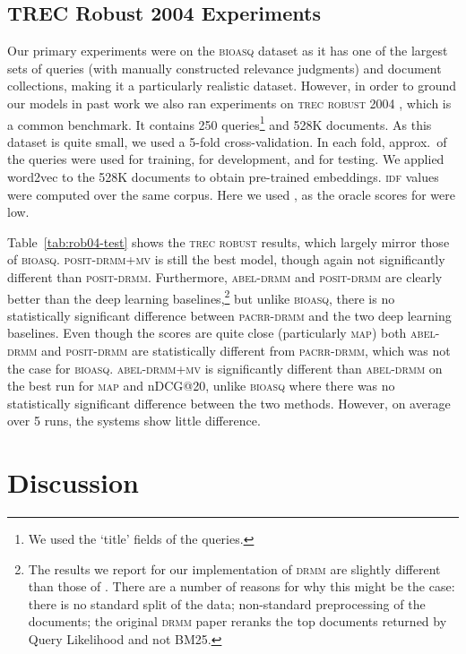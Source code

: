 \documentclass[11pt,a4paper]{article}
\newcommand{\bioasq}{\textsc{bioasq}\xspace}
\newcommand{\trecrob}{\textsc{trec robust}\xspace}
\newcommand{\drmm}{\textsc{drmm}\xspace}
\newcommand{\pacrrdrmm}{\textsc{pacrr-drmm}\xspace}
\newcommand{\abeldrmm}{\textsc{abel-drmm}\xspace}
\newcommand{\abeldrmmmv}{\textsc{abel-drmm+mv}\xspace}
\newcommand{\positdrmm}{\textsc{posit-drmm}\xspace}
\newcommand{\positdrmmmv}{\textsc{posit-drmm+mv}\xspace}
\newcommand{\idf}{\textsc{idf}\xspace}
\newcommand{\map}{\textsc{map}\xspace}
\begin{document}
\subsection{TREC Robust 2004 Experiments}

Our primary experiments were on the \bioasq 
dataset as it has one of the largest 
sets of queries (with manually constructed relevance judgments) and document collections, making it 
a particularly realistic dataset. However, in order to ground our models in past work we also ran experiments on \trecrob 2004 \cite{voorhees2005trec}, which is a common benchmark. It contains 250 
queries\footnote{We used the `title' fields of the queries.}
and 528K documents. As this dataset is quite small, we used a 5-fold cross-validation. In each fold, approx.\  of the queries were used for training,  for development, and   for testing. We applied word2vec to the 528K documents to obtain pre-trained embeddings. \idf values were computed over the same corpus. Here we used , as the oracle scores for  were low.

Table~\ref{tab:rob04-test} shows the \trecrob results, which largely mirror those of \bioasq. \positdrmmmv is still the best model, though again not significantly 
different than \positdrmm. Furthermore, \abeldrmm and \positdrmm are clearly better than the deep learning baselines,\footnote{The results we report for our implementation of \drmm are slightly different than 
those of . There are a number of reasons for why this might be the case: there is no standard split of the data; non-standard preprocessing of the documents; the original \drmm paper reranks the top documents returned by Query Likelihood and not BM25.} 
but unlike \bioasq, 
there is no statistically significant difference between \pacrrdrmm and the two deep learning baselines.
Even though the scores are quite close (particularly \map) both \abeldrmm and \positdrmm are statistically different from \pacrrdrmm, which was not the case for \bioasq.
\abeldrmmmv is significantly 
different than \abeldrmm on the best run for \map and nDCG@20, unlike \bioasq where there was no 
statistically significant difference between the 
two methods. However, on average over 5 runs, the systems show little difference.



\section{Discussion}
\end{document}
